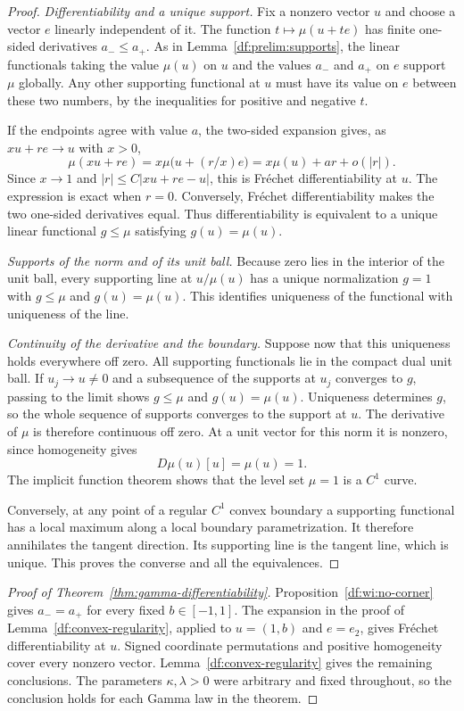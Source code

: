 \begin{proof}
\emph{Differentiability and a unique support.}
Fix a nonzero vector $u$ and choose a vector $e$ linearly independent
of it. The function $t\mapsto\mu(u+te)$ has finite one-sided
derivatives $a_-\le a_+$. As in Lemma~\ref{df:prelim:supports}, the
linear functionals taking the value $\mu(u)$ on $u$ and the values
$a_-$ and $a_+$ on $e$ support $\mu$ globally. Any other supporting
functional at $u$ must have its value on $e$ between these two
numbers, by the inequalities for positive and negative $t$.

If the endpoints agree with value $a$, the two-sided expansion gives,
as $xu+re\to u$ with $x>0$,
\[
 \mu(xu+re)
 =x\mu\bigl(u+(r/x)e\bigr)
 =x\mu(u)+ar+o(|r|).
\]
Since $x\to1$ and $|r|\le C|xu+re-u|$, this is Fr\'echet
differentiability at $u$. The expression is exact when $r=0$.
Conversely, Fr\'echet differentiability makes the two one-sided
derivatives equal. Thus differentiability is equivalent to a unique
linear functional $g\le\mu$ satisfying $g(u)=\mu(u)$.

\emph{Supports of the norm and of its unit ball.}
Because zero lies in the interior of the unit ball, every supporting
line at $u/\mu(u)$ has a unique normalization $g=1$ with
$g\le\mu$ and $g(u)=\mu(u)$. This identifies uniqueness of the
functional with uniqueness of the line.

\emph{Continuity of the derivative and the boundary.}
Suppose now that this uniqueness holds everywhere off zero. All
supporting functionals lie in the compact dual unit ball. If
$u_j\to u\ne0$ and a subsequence of the supports at $u_j$ converges
to $g$, passing to the limit shows $g\le\mu$ and $g(u)=\mu(u)$.
Uniqueness determines $g$, so the whole sequence of supports
converges to the support at $u$. The derivative of $\mu$ is therefore
continuous off zero. At a unit vector for this norm it is nonzero,
since homogeneity gives
\[
 D\mu(u)[u]=\mu(u)=1.
\]
The implicit function theorem shows that the level set $\mu=1$ is a
$C^1$ curve.

Conversely, at any point of a regular $C^1$ convex boundary a supporting
functional has a local maximum along a local boundary
parametrization. It therefore annihilates the tangent direction.
Its supporting line is the tangent line, which is unique. This
proves the converse and all the equivalences.
\end{proof}

\begin{proof}[Proof of Theorem~\ref{thm:gamma-differentiability}]
Proposition~\ref{df:wi:no-corner} gives $a_-=a_+$ for every fixed
$b\in[-1,1]$. The expansion in the proof of
Lemma~\ref{df:convex-regularity}, applied to $u=(1,b)$ and $e=e_2$,
gives Fr\'echet differentiability at $u$. Signed coordinate
permutations and positive homogeneity cover every nonzero vector.
Lemma~\ref{df:convex-regularity} gives the remaining conclusions.
The parameters $\kappa,\lambda>0$ were arbitrary and fixed throughout,
so the conclusion holds for each Gamma law in the theorem.
\end{proof}
